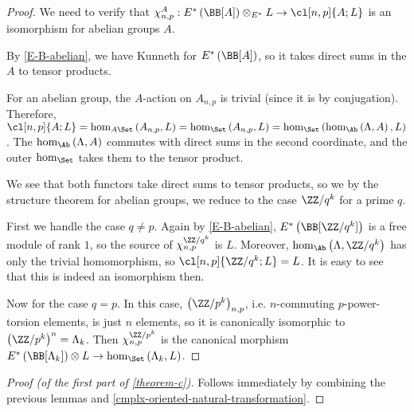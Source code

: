 \begin{proof}
	We need to verify that
	$
	\chi_{n,p}^A:
	E^*\left(\BB[A]\right) \otimes_{E^*} L
	\to \cl[n,p]{A; L}
	$
	is an isomorphism for abelian groups $A$.
	
	By \ref{E-B-abelian}, we have Kunneth for $E^*\left(\BB[A]\right)$, so it takes direct sums in the $A$ to tensor products.
	
	For an abelian group, the $A$-action on $A_{n,p}$ is trivial (since it is by conjugation).
	Therefore,
	$
	\cl[n,p]{A; L}
	= \hom_{A\Set}\left(A_{n,p}, L\right)
	= \hom_{\Set}\left(A_{n,p}, L\right)
	= \hom_{\Set}\left(\hom_{\Ab}\left(\Lambda, A\right), L\right)
	$.
	The $\hom_{\Ab}\left(\Lambda, A\right)$ commutes with direct sums in the second coordinate, and the outer $\hom_{\Set}$ takes them to the tensor product.
	
	We see that both functors take direct sums to tensor products, so we by the structure theorem for abelian groups, we reduce to the case $\ZZ/q^k$ for a prime $q$.
	
	First we handle the case $q \neq p$.
	Again by \ref{E-B-abelian}, $E^*\left(\BB[\ZZ/q^k]\right)$ is a free module of rank $1$, so the source of $\chi_{n,p}^{\ZZ/q^k}$ is $L$.
	Moreover, $\hom_{\Ab}\left(\Lambda, \ZZ/q^k\right)$ has only the trivial homomorphism, so $\cl[n,p]{\ZZ/q^k; L} = L$.
	It is easy to see that this is indeed an isomorphism then.
	
	Now for the case $q = p$.
	In this case, $\left(\ZZ/p^k\right)_{n,p}$, i.e. $n$-commuting $p$-power-torsion elements, is just $n$ elements, so it is canonically isomorphic to $\left(\ZZ/p^k\right)^n = \Lambda_k$.
	Then $\chi_{n,p}^{\ZZ/p^k}$ is the canonical morphism $E^*\left(\BB[\Lambda_k]\right) \otimes L \to \hom_{\Set}\left(\Lambda_k, L\right)$.
\end{proof}

\begin{proof}[Proof (of the first part of \ref{theorem-c})]
	Follows immediately by combining the previous lemmas and \ref{cmplx-oriented-natural-transformation}.
\end{proof}
